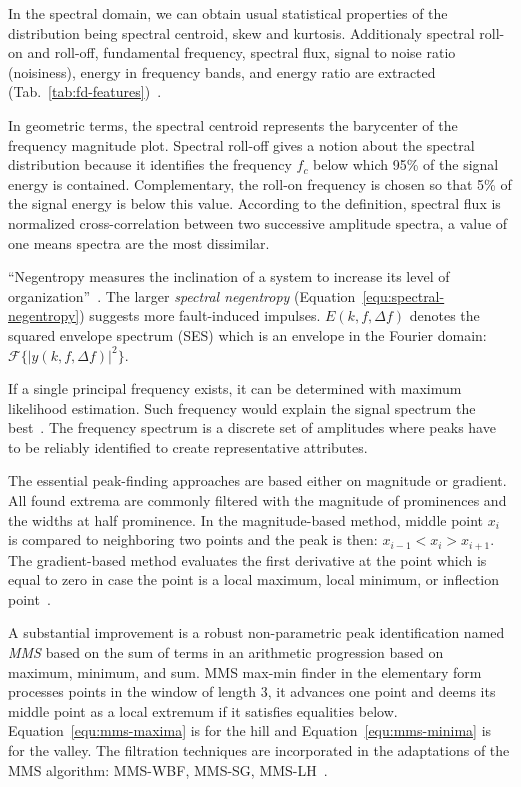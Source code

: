 In the spectral domain, we can obtain usual statistical properties of the distribution being spectral centroid, skew and kurtosis. Additionaly spectral roll-on and roll-off, fundamental frequency, spectral flux, signal to noise ratio (noisiness), energy in frequency bands, and energy ratio are extracted (Tab.~\ref{tab:fd-features})~\cite{peeters_large_2004}. 

In geometric terms, the spectral centroid represents the barycenter of the frequency magnitude plot. Spectral roll-off gives a notion about the spectral distribution because it identifies the frequency $f_c$ below which 95\% of the signal energy is contained. Complementary, the roll-on frequency is chosen so that 5\% of the signal energy is below this value. According to the definition, spectral flux is normalized cross-correlation between two successive amplitude spectra, a value of one means spectra are the most dissimilar.

``Negentropy measures the inclination of a system to increase its level of organization''~\cite{avoci_spectral_2020}. The larger \emph{spectral negentropy} (Equation~\ref{equ:spectral-negentropy}) suggests more fault-induced impulses. $E(k, f, \Delta f)$ denotes the squared envelope spectrum (SES) which is an envelope in the Fourier domain: $\mathcal{F}\{ |y(k, f, \Delta f)|^2 \}$.

If a single principal frequency exists, it can be determined with maximum likelihood estimation. Such frequency would explain the signal spectrum the best~\cite{peeters_large_2004}.  The frequency spectrum is a discrete set of amplitudes where peaks have to be reliably identified to create representative attributes.

The essential peak-finding approaches are based either on magnitude or gradient. All found extrema are commonly filtered with the magnitude of prominences and the widths at half prominence. In the magnitude-based method, middle point $x_i$ is compared to neighboring two points and the peak is then: $x_{i-1} < x_i > x_{i+1}$. The gradient-based method evaluates the first derivative at the point which is equal to zero in case the point is a local maximum, local minimum, or inflection point~\cite{adikaram_non-parametric_2016}.

A substantial improvement is a robust non-parametric peak identification named \emph{MMS} based on the sum of terms in an arithmetic progression based on maximum, minimum, and sum. MMS max-min finder in the elementary form processes points in the window of length 3, it advances one point and deems its middle point as a local extremum if it satisfies equalities below. Equation~\ref{equ:mms-maxima} is for the hill and Equation~\ref{equ:mms-minima} is for the valley. The filtration techniques are incorporated in the adaptations of the MMS algorithm: MMS-WBF, MMS-SG, MMS-LH~\cite{adikaram_non-parametric_2016}.

